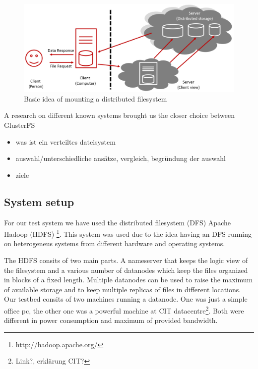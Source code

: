 \begin{figure}
\centering
\includegraphics[width=1\linewidth]{img/dfs_example.png}
\caption{Basic idea of mounting a distributed filesystem}
\label{fig:dfs_example}
\end{figure}


A research on different known systems brought us the closer choice between GlusterFS 



\begin{itemize}
\item was ist ein verteiltes dateisystem
\item auswahl/unterschiedliche ansätze, vergleich, begründung der auswahl
\item ziele
\end{itemize}


\subsection{System setup}

For our test system we have used the distributed filesystem (DFS) Apache Hadoop\textsuperscript{\textregistered} (HDFS) \footnote{http://hadoop.apache.org/}. This system was used due to the idea having an DFS running on heterogeneus systems from different hardware and operating systems. 

The HDFS consits of two main parts. A nameserver that keeps the logic view of the filesystem and a various number of datanodes which keep the files organized in blocks of a fixed length. Multiple datanodes can be used to raise the maximum of available storage and to keep multiple replicas of files in different locations. Our testbed consits of two machines running a datanode. One was just a simple office pc, the other one was a powerful machine at CIT datacentre\footnote{Link?, erklärung CIT?}. Both were different in power consumption and maximum of provided bandwidth. 

